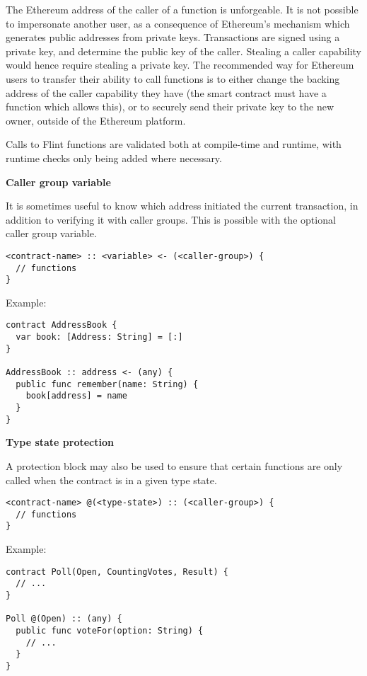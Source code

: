 The Ethereum address of the caller of a function is unforgeable. It is not possible to impersonate another user, as a consequence of Ethereum’s mechanism which generates public addresses from private keys. Transactions are signed using a private key, and determine the public key of the caller. Stealing a caller capability would hence require stealing a private key. The recommended way for Ethereum users to transfer their ability to call functions is to either change the backing address of the caller capability they have (the smart contract must have a function which allows this), or to securely send their private key to the new owner, outside of the Ethereum platform.

Calls to Flint functions are validated both at compile-time and runtime, with runtime checks only being added where necessary.

\textbf{Caller group variable}
\label{sec:appendix-b-caller-group-variable}

It is sometimes useful to know which address initiated the current transaction, in addition to verifying it with caller groups. This is possible with the optional caller group variable.

\begin{verbatim}
<contract-name> :: <variable> <- (<caller-group>) {
  // functions
}
\end{verbatim}

Example:

\begin{verbatim}
contract AddressBook {
  var book: [Address: String] = [:]
}

AddressBook :: address <- (any) {
  public func remember(name: String) {
    book[address] = name
  }
}
\end{verbatim}

\textbf{Type state protection}
\label{sec:appendix-b-type-state-protection}

A protection block may also be used to ensure that certain functions are only called when the contract is in a given type state.

\begin{verbatim}
<contract-name> @(<type-state>) :: (<caller-group>) {
  // functions
}
\end{verbatim}

Example:

\begin{verbatim}
contract Poll(Open, CountingVotes, Result) {
  // ...
}

Poll @(Open) :: (any) {
  public func voteFor(option: String) {
    // ...
  }
}
\end{verbatim}

